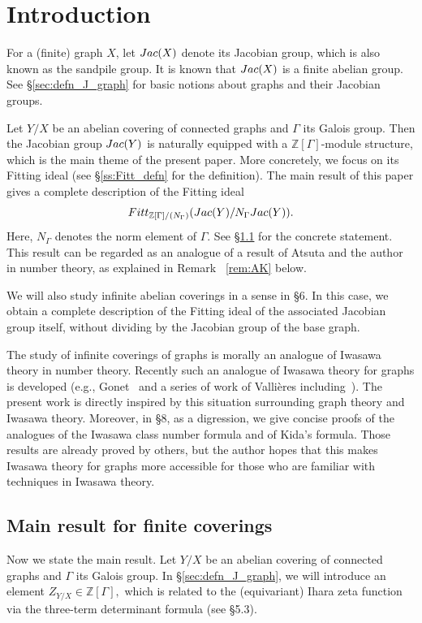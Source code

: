 \documentclass[11pt]{article}
\theoremstyle{definition}
\numberwithin{equation}{section}
\newcommand{\Z}{\mathbb{Z}}
\newcommand{\Jac}{{\rm Jac}}
\newcommand{\Fitt}{{\rm Fitt}}
\begin{document}
\section{Introduction}\label{sec:intro}

For a (finite) graph $X$, let $\Jac(X)$ denote its Jacobian group, which is also known as the sandpile group.
It is known that $\Jac(X)$ is a finite abelian group.
See \S\ref{sec:defn_J_graph} for basic notions about graphs and their Jacobian groups.

Let $Y/X$ be an abelian covering of connected graphs and $\Gamma$ its Galois group.
Then the Jacobian group $\Jac(Y)$ is naturally equipped with a $\Z[\Gamma]$-module structure, which is the main theme of the present paper.
More concretely, we focus on its Fitting ideal (see \S\ref{ss:Fitt_defn} for the definition).
The main result of this paper gives a complete description of the Fitting ideal
\[
\Fitt_{\Z[\Gamma]/(N_{\Gamma})}(\Jac(Y)/N_{\Gamma}\Jac(Y)).
\]
Here, $N_{\Gamma}$ denotes the norm element of $\Gamma$.
See \S\ref{ss:main_result} for the concrete statement.
This result can be regarded as an analogue of a result of Atsuta and the author~\cite{AK21} in number theory, as explained in Remark ~\ref{rem:AK} below.

We will also study infinite abelian coverings in a sense in \S6.
In this case, we obtain a complete description of the Fitting ideal of the associated Jacobian group itself, without dividing by the Jacobian group of the base graph.

The study of infinite coverings of graphs is morally an analogue of Iwasawa theory in number theory.
Recently such an analogue of Iwasawa theory for graphs is developed (e.g., Gonet~\cite{Gon22} and a series of work of Valli\`{e}res including~\cite{MV21b}).
The present work is directly inspired by this situation surrounding graph theory and Iwasawa theory.
Moreover, in \S8, as a digression, we give concise proofs of the analogues of the Iwasawa class number formula and of Kida's formula.
Those results are already proved by others, but the author hopes that this makes Iwasawa theory for graphs more accessible for those who are familiar with techniques in Iwasawa theory.

\subsection{Main result for finite coverings}\label{ss:main_result}

Now we state the main result.
Let $Y/X$ be an abelian covering of connected graphs and $\Gamma$ its Galois group.
In \S\ref{sec:defn_J_graph}, we will introduce an element
$
Z_{Y/X} \in \Z[\Gamma],
$
which is related to the (equivariant) Ihara zeta function via the three-term determinant formula (see \S5.3).
\end{document}
